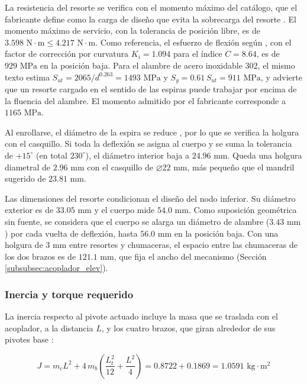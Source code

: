 \documentclass[../../General.tex]{subfiles}
\begin{document}
La resistencia del resorte se verifica con el momento máximo del catálogo, que el fabricante define como la carga de diseño que evita la sobrecarga del resorte \citep{leespring_torsion}. El momento máximo de servicio, con la tolerancia de posición libre, es de $3.598\text{ N}\cdot\text{m} \leq 4.217\text{ N}\cdot\text{m}$. Como referencia, el esfuerzo de flexión según \citet{Shigley11th}, con el factor de corrección por curvatura $K_i = 1.094$ para el índice $C = 8.64$, es de $929\text{ MPa}$ en la posición baja. Para el alambre de acero inoxidable 302, el mismo texto estima $S_{ut} = 2065/d^{0.263} = 1493\text{ MPa}$ y $S_y = 0.61\,S_{ut} = 911\text{ MPa}$, y advierte que un resorte cargado en el sentido de las espiras puede trabajar por encima de la fluencia del alambre. El momento admitido por el fabricante corresponde a $1165\text{ MPa}$.

Al enrollarse, el diámetro de la espira se reduce \citep{Shigley11th}, por lo que se verifica la holgura con el casquillo. Si toda la deflexión se asigna al cuerpo y se suma la tolerancia de $+15^\circ$ (en total $230^\circ$), el diámetro interior baja a $24.96\text{ mm}$. Queda una holgura diametral de $2.96\text{ mm}$ con el casquillo de $\varnothing 22\text{ mm}$, más pequeño que el mandril sugerido de $23.81\text{ mm}$.

Las dimensiones del resorte condicionan el diseño del nodo inferior. Su diámetro exterior es de $33.05\text{ mm}$ y el cuerpo mide $54.0\text{ mm}$. Como suposición geométrica sin fuente, se considera que el cuerpo se alarga un diámetro de alambre ($3.43\text{ mm}$) por cada vuelta de deflexión, hasta $56.0\text{ mm}$ en la posición baja. Con una holgura de $3\text{ mm}$ entre resortes y chumaceras, el espacio entre las chumaceras de los dos brazos es de $121.1\text{ mm}$, que fija el ancho del mecanismo (Sección \ref{subsubsec:acoplador_elev}).

\subsubsection{Inercia y torque requerido}\label{subsubsec:torque_elev}

La inercia respecto al pivote actuado incluye la masa que se traslada con el acoplador, a la distancia $L$, y los cuatro brazos, que giran alrededor de sus pivotes base \citep{norton2020maquinaria}:

\begin{equation}\label{eq:J_elev}
    J = m_c L^2 + 4\, m_b\left(\frac{L_t^2}{12} + \frac{L^2}{4}\right) = 0.8722 + 0.1869 = 1.0591\text{ kg}\cdot\text{m}^2
\end{equation}
\end{document}
